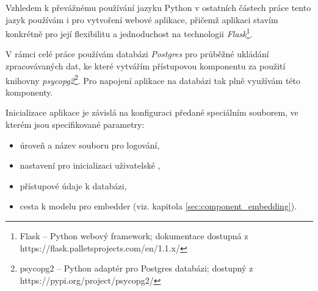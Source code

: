 \documentclass[thesis=M,czech]{FITthesis}[2019/12/23]
\begin{document}
Vzhledem k převážnému používání jazyku Python v ostatních částech práce tento jazyk používám i pro vytvoření webové aplikace, přičemž aplikaci stavím konkrétně pro její flexibilitu a jednoduchost na technologii \textit{Flask}\footnote{Flask -- Python webový framework;\newline
dokumentace dostupná z https://flask.palletsprojects.com/en/1.1.x/}.

V rámci celé práce používám databázi \textit{Postgres} pro průběžné ukládání zpracovávaných dat, ke které vytvářím přístupovou komponentu za použití knihovny \textit{psycopg2}\footnote{psycopg2 -- Python adaptér pro Postgres databázi;\newline
dostupný z https://pypi.org/project/psycopg2/}. Pro napojení aplikace na databázi tak plně využívám této komponenty.

Inicializace aplikace je závislá na konfiguraci předané speciálním souborem, ve kterém jsou specifikované parametry:
\begin{itemize}
    \item úroveň a název souboru pro logování,
    \item nastavení pro inicializaci uživatelské ,
    \item přístupové údaje k databázi,
    \item cesta k modelu pro embedder (viz. kapitola \ref{sec:component_embedding}).
\end{itemize}
\newpage
\end{document}
